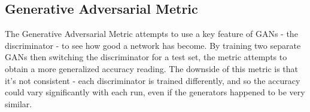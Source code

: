 \subsection{Generative Adversarial Metric}
\label{sub:generative_adversarial_metric}

The Generative Adversarial Metric attempts to use a key feature of GANs - the discriminator - to see how good a network has become. 
By training two separate GANs then switching the discriminator for a test set, the metric attempts to obtain a more generalized accuracy reading.
The downside of this metric is that it's not consistent - each discriminator is trained differently, and so the accuracy could vary significantly with each run, even if the generators happened to be very similar.